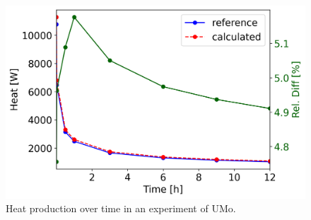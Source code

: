 \begin{figure}[htbp!] %
    \centering
    \includegraphics[width=0.60\linewidth]{figures/u-mo-tot-vs-t}
    \hfill
    \caption{Heat production over time in an experiment of UMo.}
    \label{fig:atr-time-umo}
\end{figure}



